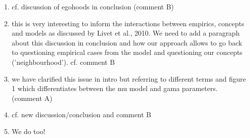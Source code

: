 \documentclass[11pt,a4paper,sans]{moderncv}        %
\begin{document}
\begin{enumerate}
  \item cf. discussion of egohoods in conclusion (comment B)
  
   \item this is very interesting to inform the interactions between empirics, concepts and models as discussed by Livet et al., 2010. We need to add a paragraph about this discussion in conclusion and how our approach allows to go back to questioning empirical cases from the model and questioning our concepts ('neighbourhood'). cf. comment B

 \item we have clarified this issue in intro but referring to different terms and figure 1 which differentiates between the mu model and gama parameters. (comment A)
  \item cf. new discussion/conclusion and comment B

\item We do too!

\end{enumerate}






\end{document}
